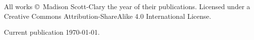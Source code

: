 \singlespacing
\thispagestyle{empty}
\null
\vfill
{\small
\noindent All works \copyright\ Madison Scott-Clary the year of their publications. Licensed under a Creative Commons Attribution-ShareAlike 4.0 International License.

\vspace{0.25in}

\noindent Current publication \today.
}

\clearpage
